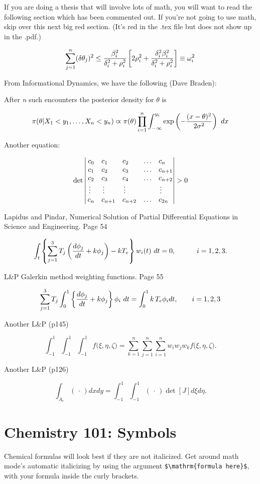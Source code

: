 \documentclass[12pt,twoside]{reedthesis}
\begin{document}
	If you are doing a thesis that will involve lots of math, you will want to read the following section which has been commented out. If you're not going to use math, skip over this next big red section. (It's red in the .tex file but does not show up in the .pdf.)
	
	$$\sum_{j=1}^n (\delta\theta_j)^2 \leq {{\beta_i^2}\over{\delta_i^2 + \rho_i^2}}
\left[ 2\rho_i^2 + {\delta_i^2\beta_i^2\over{\delta_i^2 + \rho_i^2}} \right] \equiv \omega_i^2
$$

From Informational Dynamics, we have the following (Dave Braden):

After {\it n} such encounters the posterior density for $\theta$ is

$$
\pi(\theta|X_1< y_1,\dots,X_n<y_n) \varpropto \pi(\theta) \prod_{i=1}^n\int_{-\infty}^{y_i}
   \exp\left(-{(x-\theta)^2\over{2\sigma^2}}\right)\ dx
$$



Another equation:

$$\det\left|\,\begin{matrix}%
c_0&c_1\hfill&c_2\hfill&\ldots&c_n\hfill\cr
c_1&c_2\hfill&c_3\hfill&\ldots&c_{n+1}\hfill\cr
c_2&c_3\hfill&c_4\hfill&\ldots&c_{n+2}\hfill\cr
\,\vdots\hfill&\,\vdots\hfill&
  \,\vdots\hfill&&\,\vdots\hfill\cr
c_n&c_{n+1}\hfill&c_{n+2}\hfill&\ldots&c_{2n}\hfill\cr
\end{matrix}\right|>0$$


Lapidus and Pindar, Numerical Solution of Partial Differential Equations in Science and
Engineering.  Page 54

$$
\int_t\left\{\sum_{j=1}^3 T_j \left({d\phi_j\over dt}+k\phi_j\right)-kT_e\right\}w_i(t)\ dt=0,
   \qquad\quad i=1,2,3. 
$$

L\&P  Galerkin method weighting functions.  Page 55

$$
\sum_{j=1}^3 T_j\int_0^1\left\{{d\phi_j\over dt} + k\phi_j\right\} \phi_i\ dt 
   = \int_{0}^1k\,T_e\phi_idt, \qquad i=1,2,3 $$
   
Another L\&P (p145)

$$
\int_{-1}^1\!\int_{-1}^1\!\int_{-1}^1 f\big(\xi,\eta,\zeta\big) 
   = \sum_{k=1}^n\sum_{j=1}^n\sum_{i=1}^n w_i w_j w_k f\big( \xi,\eta,\zeta\big).
$$

Another L\&P (p126)

$$
\int_{A_e} (\,\cdot\,) dx dy = \int_{-1}^1\!\int_{-1}^1 (\,\cdot\,) \det[J] d\xi d\eta.
$$

\section{Chemistry 101: Symbols}
Chemical formulas will look best if they are not italicized. Get around math mode's automatic italicizing by using the argument \verb=$\mathrm{formula here}$=, with your formula inside the curly brackets.
\end{document}
